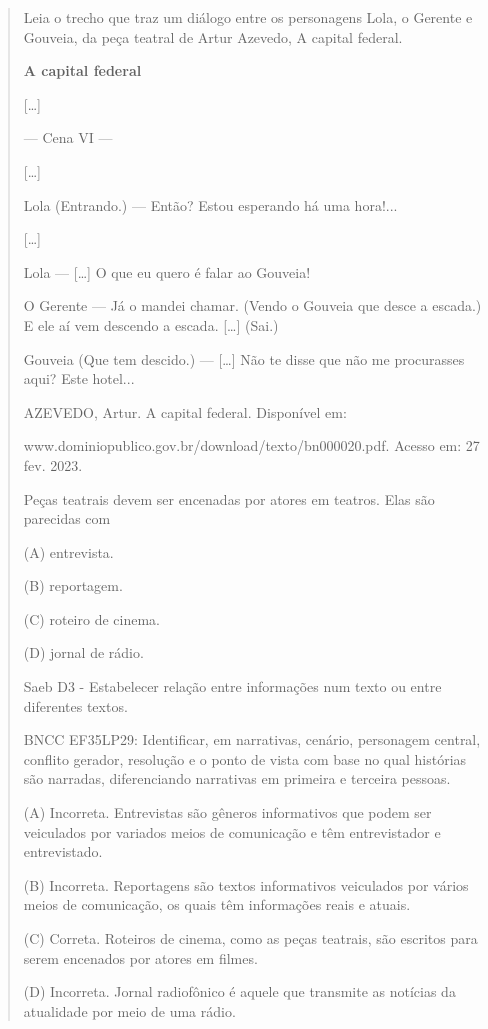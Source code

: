 \begin{quote}
Leia o trecho que traz um diálogo entre os personagens Lola, o Gerente e
Gouveia, da peça teatral de Artur Azevedo, A capital federal.

\textbf{A capital federal}

{[}\ldots{}{]}

--- Cena VI ---

{[}\ldots{}{]}

Lola (Entrando.) --- Então? Estou esperando há uma hora!...

{[}\ldots{}{]}

Lola --- {[}\ldots{}{]} O que eu quero é falar ao Gouveia!

O Gerente --- Já o mandei chamar. (Vendo o Gouveia que desce a escada.)
E ele aí vem descendo a escada. {[}\ldots{}{]} (Sai.)

Gouveia (Que tem descido.) --- {[}\ldots{}{]} Não te disse que não me
procurasses aqui? Este hotel...

AZEVEDO, Artur. A capital federal. Disponível em:

www.dominiopublico.gov.br/download/texto/bn000020.pdf. Acesso em: 27
fev. 2023.

Peças teatrais devem ser encenadas por atores em teatros. Elas são
parecidas com

(A) entrevista.

(B) reportagem.

(C) roteiro de cinema.

(D) jornal de rádio.

Saeb D3 - Estabelecer relação entre informações num texto ou entre
diferentes textos.

BNCC EF35LP29: Identificar, em narrativas, cenário, personagem central,
conflito gerador, resolução e o ponto de vista com base no qual
histórias são narradas, diferenciando narrativas em primeira e terceira
pessoas.

(A) Incorreta. Entrevistas são gêneros informativos que podem ser
veiculados por variados meios de comunicação e têm entrevistador e
entrevistado.

(B) Incorreta. Reportagens são textos informativos veiculados por vários
meios de comunicação, os quais têm informações reais e atuais.

(C) Correta. Roteiros de cinema, como as peças teatrais, são escritos
para serem encenados por atores em filmes.

(D) Incorreta. Jornal radiofônico é aquele que transmite as notícias da
atualidade por meio de uma rádio.
\end{quote}

